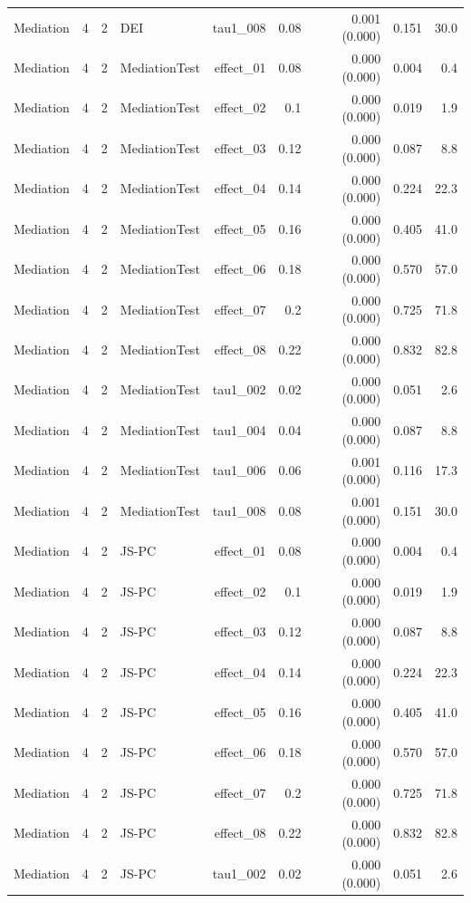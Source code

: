 \begin{longtable}{lcclrrrrr}
Mediation & 4 & 2 & DEI & tau1\_008 & 0.08 & 0.001 (0.000) & 0.151 & 30.0\\
Mediation & 4 & 2 & MediationTest & effect\_01 & 0.08 & 0.000 (0.000) & 0.004 & 0.4\\
Mediation & 4 & 2 & MediationTest & effect\_02 & 0.1 & 0.000 (0.000) & 0.019 & 1.9\\
Mediation & 4 & 2 & MediationTest & effect\_03 & 0.12 & 0.000 (0.000) & 0.087 & 8.8\\
Mediation & 4 & 2 & MediationTest & effect\_04 & 0.14 & 0.000 (0.000) & 0.224 & 22.3\\
Mediation & 4 & 2 & MediationTest & effect\_05 & 0.16 & 0.000 (0.000) & 0.405 & 41.0\\
Mediation & 4 & 2 & MediationTest & effect\_06 & 0.18 & 0.000 (0.000) & 0.570 & 57.0\\
Mediation & 4 & 2 & MediationTest & effect\_07 & 0.2 & 0.000 (0.000) & 0.725 & 71.8\\
Mediation & 4 & 2 & MediationTest & effect\_08 & 0.22 & 0.000 (0.000) & 0.832 & 82.8\\
Mediation & 4 & 2 & MediationTest & tau1\_002 & 0.02 & 0.000 (0.000) & 0.051 & 2.6\\
Mediation & 4 & 2 & MediationTest & tau1\_004 & 0.04 & 0.000 (0.000) & 0.087 & 8.8\\
Mediation & 4 & 2 & MediationTest & tau1\_006 & 0.06 & 0.001 (0.000) & 0.116 & 17.3\\
Mediation & 4 & 2 & MediationTest & tau1\_008 & 0.08 & 0.001 (0.000) & 0.151 & 30.0\\
Mediation & 4 & 2 & JS-PC & effect\_01 & 0.08 & 0.000 (0.000) & 0.004 & 0.4\\
Mediation & 4 & 2 & JS-PC & effect\_02 & 0.1 & 0.000 (0.000) & 0.019 & 1.9\\
Mediation & 4 & 2 & JS-PC & effect\_03 & 0.12 & 0.000 (0.000) & 0.087 & 8.8\\
Mediation & 4 & 2 & JS-PC & effect\_04 & 0.14 & 0.000 (0.000) & 0.224 & 22.3\\
Mediation & 4 & 2 & JS-PC & effect\_05 & 0.16 & 0.000 (0.000) & 0.405 & 41.0\\
Mediation & 4 & 2 & JS-PC & effect\_06 & 0.18 & 0.000 (0.000) & 0.570 & 57.0\\
Mediation & 4 & 2 & JS-PC & effect\_07 & 0.2 & 0.000 (0.000) & 0.725 & 71.8\\
Mediation & 4 & 2 & JS-PC & effect\_08 & 0.22 & 0.000 (0.000) & 0.832 & 82.8\\
Mediation & 4 & 2 & JS-PC & tau1\_002 & 0.02 & 0.000 (0.000) & 0.051 & 2.6\\

\end{longtable}
